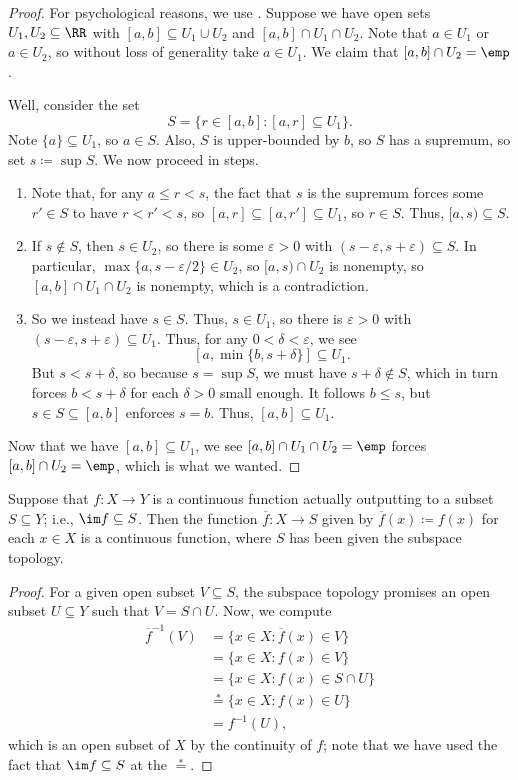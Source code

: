 \documentclass[../notes.tex]{subfiles}
\begin{document}
\begin{proof}
	For psychological reasons, we use . Suppose we have open sets $U_1,U_2\subseteq\RR$ with $[a,b]\subseteq U_1\cup U_2$ and $[a,b]\cap U_1\cap U_2$. Note that $a\in U_1$ or $a\in U_2$, so without loss of generality take $a\in U_1$. We claim that $[a,b]\cap U_2=\emp$.

	Well, consider the set
	\[S=\{r\in[a,b]:[a,r]\subseteq U_1\}.\]
	Note $\{a\}\subseteq U_1$, so $a\in S$. Also, $S$ is upper-bounded by $b$, so $S$ has a supremum, so set $s\coloneqq\sup S$. We now proceed in steps.
	\begin{enumerate}
		\item Note that, for any $a\le r<s$, the fact that $s$ is the supremum forces some $r'\in S$ to have $r<r'<s$, so $[a,r]\subseteq[a,r']\subseteq U_1$, so $r\in S$. Thus, $[a,s)\subseteq S$.
		\item If $s\notin S$, then $s\in U_2$, so there is some $\varepsilon>0$ with $(s-\varepsilon,s+\varepsilon)\subseteq S$. In particular, $\max\{a,s-\varepsilon/2\}\in U_2$, so $[a,s)\cap U_2$ is nonempty, so $[a,b]\cap U_1\cap U_2$ is nonempty, which is a contradiction.
		\item So we instead have $s\in S$. Thus, $s\in U_1$, so there is $\varepsilon>0$ with $(s-\varepsilon,s+\varepsilon)\subseteq U_1$. Thus, for any $0<\delta<\varepsilon$, we see
		\[[a,\min\{b,s+\delta\}]\subseteq U_1.\]
		But $s<s+\delta$, so because $s=\sup S$, we must have $s+\delta\notin S$, which in turn forces $b<s+\delta$ for each $\delta>0$ small enough. It follows $b\le s$, but $s\in S\subseteq[a,b]$ enforces $s=b$. Thus, $[a,b]\subseteq U_1$.
	\end{enumerate}
	Now that we have $[a,b]\subseteq U_1$, we see $[a,b]\cap U_1\cap U_2=\emp$ forces $[a,b]\cap U_2=\emp$, which is what we wanted.
\end{proof}
\begin{lemma} \label{lem:res-im-cont}
	Suppose that $f\colon X\to Y$ is a continuous function actually outputting to a subset $S\subseteq Y$; i.e., $\im f\subseteq S$. Then the function $\overline f\colon X\to S$ given by $\overline f(x)\coloneqq f(x)$ for each $x\in X$ is a continuous function, where $S$ has been given the subspace topology.
\end{lemma}
\begin{proof}
	For a given open subset $V\subseteq S$, the subspace topology promises an open subset $U\subseteq Y$ such that $V=S\cap U$. Now, we compute
	\begin{align*}
		\overline f^{-1}(V) &= \{x\in X:\overline f(x)\in V\} \\
		&= \{x\in X:f(x)\in V\} \\
		&= \{x\in X:f(x)\in S\cap U\} \\
		&\stackrel*= \{x\in X:f(x)\in U\} \\
		&= f^{-1}(U),
	\end{align*}
	which is an open subset of $X$ by the continuity of $f$; note that we have used the fact that $\im f\subseteq S$ at the $\stackrel*=$.
\end{proof}
\end{document}
